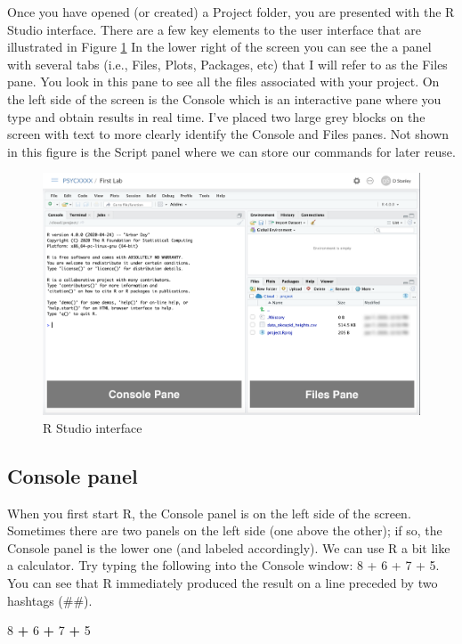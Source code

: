 \documentclass[
]{krantz}
\makeatletter
\newenvironment{Shaded}{\begin{snugshade}}{\end{snugshade}}
\newcommand{\DecValTok}[1]{\textcolor[rgb]{0.06,0.06,0.06}{#1}}
\newcommand{\OperatorTok}[1]{\textcolor[rgb]{0.43,0.43,0.43}{\textbf{#1}}}
\newcommand{\StringTok}[1]{\textcolor[rgb]{0.5,0.5,0.5}{#1}}
\newenvironment{kframe}{%
\medskip{}
\setlength{\fboxsep}{.8em}
 \def\at@end@of@kframe{}%
 \ifinner\ifhmode%
  \def\at@end@of@kframe{\end{minipage}}%
  \begin{minipage}{\columnwidth}%
 \fi\fi%
 \def\FrameCommand##1{\hskip\@totalleftmargin \hskip-\fboxsep
 \colorbox{shadecolor}{##1}\hskip-\fboxsep
     \hskip-\linewidth \hskip-\@totalleftmargin \hskip\columnwidth}%
 \MakeFramed {\advance\hsize-\width
   \@totalleftmargin\z@ \linewidth\hsize
   \@setminipage}}%
 {\par\unskip\endMakeFramed%
 \at@end@of@kframe}
\renewenvironment{Shaded}{\begin{kframe}}{\end{kframe}}
\makeatother
\begin{document}
Once you have opened (or created) a Project folder, you are presented with the R Studio interface. There are a few key elements to the user interface that are illustrated in Figure \ref{fig:interface} In the lower right of the screen you can see the a panel with several tabs (i.e., Files, Plots, Packages, etc) that I will refer to as the Files pane. You look in this pane to see all the files associated with your project. On the left side of the screen is the Console which is an interactive pane where you type and obtain results in real time. I've placed two large grey blocks on the screen with text to more clearly identify the Console and Files panes. Not shown in this figure is the Script panel where we can store our commands for later reuse.

\begin{figure}
\includegraphics[width=0.7\linewidth]{ch_introduction/images/screenshot_interface} \caption{R Studio interface}\label{fig:interface}
\end{figure}

\hypertarget{console-panel}{%
\subsection{Console panel}\label{console-panel}}

When you first start R, the Console panel is on the left side of the screen. Sometimes there are two panels on the left side (one above the other); if so, the Console panel is the lower one (and labeled accordingly). We can use R a bit like a calculator. Try typing the following into the Console window: 8 + 6 + 7 + 5. You can see that R immediately produced the result on a line preceded by two hashtags (\#\#).

\begin{Shaded}
\begin{Highlighting}[]
\DecValTok{8} \OperatorTok{+}\StringTok{ }\DecValTok{6} \OperatorTok{+}\StringTok{ }\DecValTok{7} \OperatorTok{+}\StringTok{ }\DecValTok{5}
\end{Highlighting}
\end{Shaded}
\end{document}
